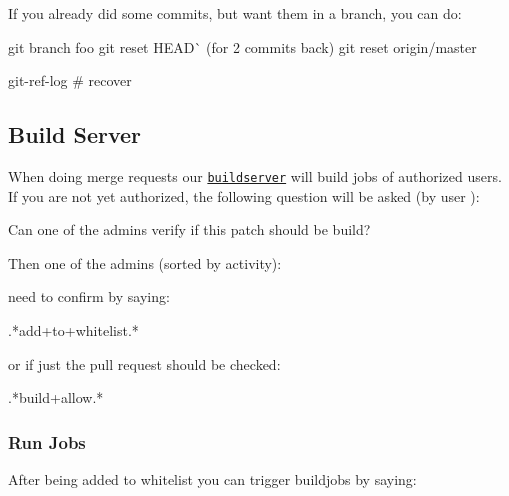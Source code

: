 If you already did some commits, but want them in a branch, you can do\+: \begin{DoxyVerb}    git branch foo
    git reset HEAD^^  (for 2 commits back)
    git reset origin/master

    git-ref-log # recover
\end{DoxyVerb}


\subsection*{Build Server}

When doing merge requests our \href{https://build.libelektra.org}{\tt buildserver} will build jobs of authorized users. If you are not yet authorized, the following question will be asked (by user )\+: \begin{DoxyVerb}    Can one of the admins verify if this patch should be build?
\end{DoxyVerb}


Then one of the admins (sorted by activity)\+:


\begin{DoxyItemize}
\item 
\item 
\item 
\item 
\item 
\item 
\end{DoxyItemize}

need to confirm by saying\+: \begin{DoxyVerb}    .*add\W+to\W+whitelist.*
\end{DoxyVerb}


or if just the pull request should be checked\+: \begin{DoxyVerb}    .*build\W+allow.*
\end{DoxyVerb}


\subsubsection*{Run Jobs}

After being added to whitelist you can trigger buildjobs by saying\+:


